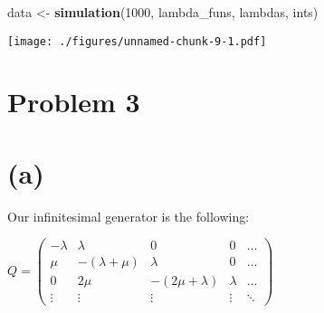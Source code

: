 \documentclass[]{article}
\newenvironment{Shaded}{\begin{snugshade}}{\end{snugshade}}
\newcommand{\CommentTok}[1]{\textcolor[rgb]{0.56,0.35,0.01}{\textit{#1}}}
\newcommand{\ControlFlowTok}[1]{\textcolor[rgb]{0.13,0.29,0.53}{\textbf{#1}}}
\newcommand{\DecValTok}[1]{\textcolor[rgb]{0.00,0.00,0.81}{#1}}
\newcommand{\FloatTok}[1]{\textcolor[rgb]{0.00,0.00,0.81}{#1}}
\newcommand{\KeywordTok}[1]{\textcolor[rgb]{0.13,0.29,0.53}{\textbf{#1}}}
\newcommand{\NormalTok}[1]{#1}
\newcommand{\OperatorTok}[1]{\textcolor[rgb]{0.81,0.36,0.00}{\textbf{#1}}}
\newcommand{\StringTok}[1]{\textcolor[rgb]{0.31,0.60,0.02}{#1}}
\begin{document}
\newpage

\begin{Shaded}
\begin{Highlighting}[]
\NormalTok{data <-}\StringTok{ }\KeywordTok{simulation}\NormalTok{(}\DecValTok{1000}\NormalTok{, lambda_funs, lambdas, ints)}
\end{Highlighting}
\end{Shaded}

\texttt{[image: ./figures/unnamed-chunk-9-1.pdf]}

\begin{Shaded}
\end{Shaded}

\hypertarget{problem-3}{%
\section{Problem 3}\label{problem-3}}

\hypertarget{a-1}{%
\section{(a)}\label{a-1}}

Our infinitesimal generator is the following:

\(Q = \begin{pmatrix} - \lambda & \lambda & 0 & 0 & \dots \\ \mu & - (\lambda + \mu) & \lambda & 0 & \dots \\ 0 & 2 \mu & - (2 \mu + \lambda) & \lambda & \dots \\ \vdots & \vdots & \vdots & \vdots & \ddots \end{pmatrix}\)
\end{document}
